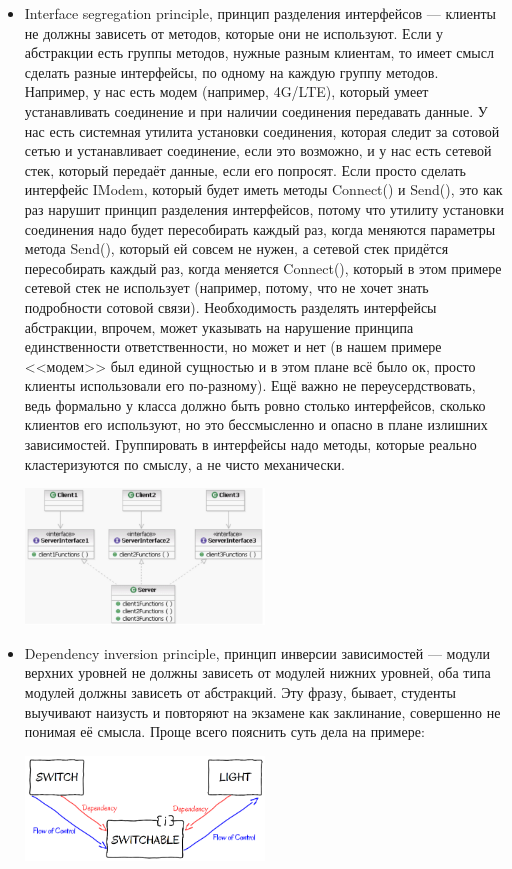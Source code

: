 \documentclass{../text-style}
\begin{document}
\begin{itemize}
    \item Interface segregation principle, принцип разделения интерфейсов --- клиенты не должны зависеть от методов, которые они не используют. Если у абстракции есть группы методов, нужные разным клиентам, то имеет смысл сделать разные интерфейсы, по одному на каждую группу методов. Например, у нас есть модем (например, 4G/LTE), который умеет устанавливать соединение и при наличии соединения передавать данные. У нас есть системная утилита установки соединения, которая следит за сотовой сетью и устанавливает соединение, если это возможно, и у нас есть сетевой стек, который передаёт данные, если его попросят. Если просто сделать интерфейс IModem, который будет иметь методы Connect() и Send(), это как раз нарушит принцип разделения интерфейсов, потому что утилиту установки соединения надо будет пересобирать каждый раз, когда меняются параметры метода Send(), который ей совсем не нужен, а сетевой стек придётся пересобирать каждый раз, когда меняется Connect(), который в этом примере сетевой стек не использует (например, потому, что не хочет знать подробности сотовой связи). Необходимость разделять интерфейсы абстракции, впрочем, может указывать на нарушение принципа единственности ответственности, но может и нет (в нашем примере <<модем>> был единой сущностью и в этом плане всё было ок, просто клиенты использовали его по-разному). Ещё важно не переусердствовать, ведь формально у класса должно быть ровно столько интерфейсов, сколько клиентов его используют, но это бессмысленно и опасно в плане излишних зависимостей. Группировать в интерфейсы надо методы, которые реально кластеризуются по смыслу, а не чисто механически.
        \begin{center}
            \includegraphics[width=0.5\textwidth]{interfaceSegregationPrinciple.png}
        \end{center}
    \item Dependency inversion principle, принцип инверсии зависимостей --- модули верхних уровней не должны зависеть от модулей нижних уровней, оба типа модулей должны зависеть от абстракций. Эту фразу, бывает, студенты выучивают наизусть и повторяют на экзамене как заклинание, совершенно не понимая её смысла. Проще всего пояснить суть дела на примере:
        \begin{center}
            \includegraphics[width=0.5\textwidth]{dependencyInversionPrinciple.png}
        \end{center}


\end{itemize}
\end{document}
